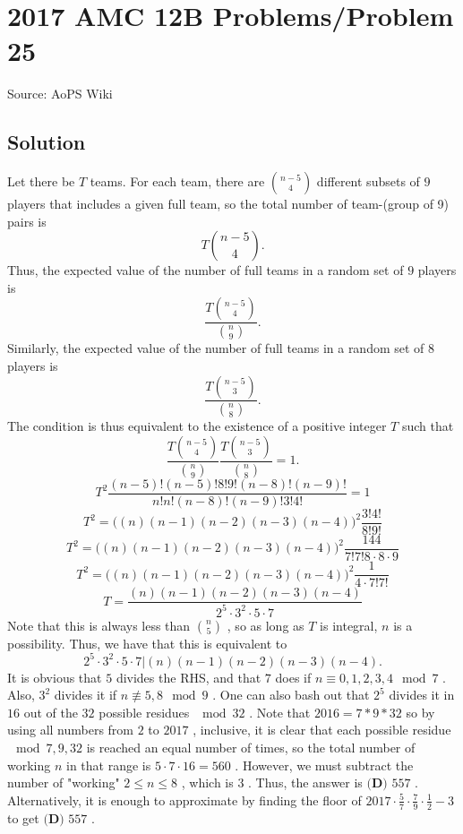 \documentclass[12pt]{article}
\begin{document}
\section*{{2017 AMC 12B Problems/Problem 25}}
Source: AoPS Wiki

\subsection*{Solution}
Let there be $T$ teams. For each team, there are ${n-5\choose 4}$ different subsets of $9$ players that includes a given full team, so the total number of team-(group of 9) pairs is \[T{n-5\choose 4}.\] Thus, the expected value of the number of full teams in a random set of $9$ players is \[\frac{T{n-5\choose 4}}{{n\choose 9}}.\] Similarly, the expected value of the number of full teams in a random set of $8$ players is \[\frac{T{n-5\choose 3}}{{n\choose 8}}.\] The condition is thus equivalent to the existence of a positive integer $T$ such that \[\frac{T{n-5\choose 4}}{{n\choose 9}}\frac{T{n-5\choose 3}}{{n\choose 8}} = 1.\] \[T^2\frac{(n-5)!(n-5)!8!9!(n-8)!(n-9)!}{n!n!(n-8)!(n-9)!3!4!} = 1\] \[T^2 = \big((n)(n-1)(n-2)(n-3)(n-4)\big)^2 \frac{3!4!}{8!9!}\] \[T^2 = \big((n)(n-1)(n-2)(n-3)(n-4)\big)^2 \frac{144}{7!7!8\cdot8\cdot9}\] \[T^2 = \big((n)(n-1)(n-2)(n-3)(n-4)\big)^2 \frac{1}{4\cdot7!7!}\] \[T = \frac{(n)(n-1)(n-2)(n-3)(n-4)}{2^5\cdot3^2\cdot5\cdot7}\] Note that this is always less than ${n\choose 5}$ , so as long as $T$ is integral, $n$ is a possibility. Thus, we have that this is equivalent to \[2^5\cdot3^2\cdot5\cdot7\big|(n)(n-1)(n-2)(n-3)(n-4).\] It is obvious that $5$ divides the RHS, and that $7$ does if $n\equiv 0,1,2,3,4\mod 7$ . Also, $3^2$ divides it if $n\not\equiv 5,8\mod 9$ . One can also bash out that $2^5$ divides it in $16$ out of the $32$ possible residues $\mod 32$ . Note that $2016 = 7*9*32$ so by using all numbers from $2$ to $2017$ , inclusive, it is clear that each possible residue $\mod 7,9,32$ is reached an equal number of times, so the total number of working $n$ in that range is $5\cdot 7\cdot 16 = 560$ . However, we must subtract the number of "working" $2\leq n\leq 8$ , which is $3$ . Thus, the answer is $\boxed{\textbf{(D) } 557}$ . Alternatively, it is enough to approximate by finding the floor of $2017 \cdot \frac57 \cdot \frac79 \cdot \frac12 - 3$ to get $\boxed{\textbf{(D) } 557}$ .
\end{document}

